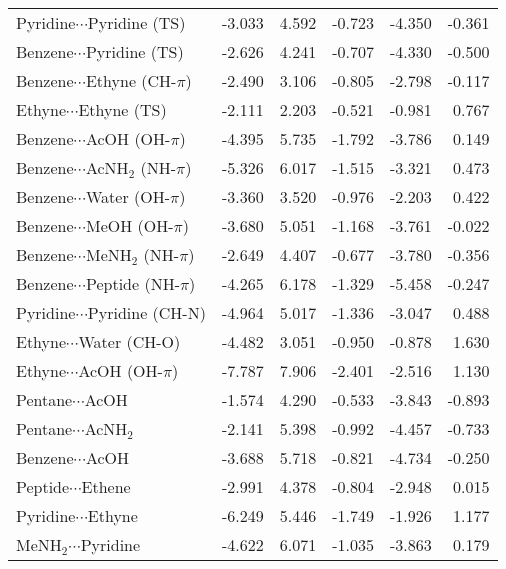 \begin{longtable}{lrrrrr}
Pyridine$\cdots$Pyridine (TS) & -3.033 & 4.592 & -0.723 & -4.350 & -0.361 \\
Benzene$\cdots$Pyridine (TS) & -2.626 & 4.241 & -0.707 & -4.330 & -0.500 \\
Benzene$\cdots$Ethyne (CH-$\pi$) & -2.490 & 3.106 & -0.805 & -2.798 & -0.117 \\
Ethyne$\cdots$Ethyne (TS) & -2.111 & 2.203 & -0.521 & -0.981 & 0.767 \\
Benzene$\cdots$AcOH (OH-$\pi$) & -4.395 & 5.735 & -1.792 & -3.786 & 0.149 \\
Benzene$\cdots$AcNH$_2$ (NH-$\pi$) & -5.326 & 6.017 & -1.515 & -3.321 & 0.473 \\
Benzene$\cdots$Water (OH-$\pi$) & -3.360 & 3.520 & -0.976 & -2.203 & 0.422 \\
Benzene$\cdots$MeOH (OH-$\pi$) & -3.680 & 5.051 & -1.168 & -3.761 & -0.022 \\
Benzene$\cdots$MeNH$_2$ (NH-$\pi$) & -2.649 & 4.407 & -0.677 & -3.780 & -0.356 \\
Benzene$\cdots$Peptide (NH-$\pi$) & -4.265 & 6.178 & -1.329 & -5.458 & -0.247 \\
Pyridine$\cdots$Pyridine (CH-N) & -4.964 & 5.017 & -1.336 & -3.047 & 0.488 \\
Ethyne$\cdots$Water (CH-O) & -4.482 & 3.051 & -0.950 & -0.878 & 1.630 \\
Ethyne$\cdots$AcOH (OH-$\pi$) & -7.787 & 7.906 & -2.401 & -2.516 & 1.130 \\
Pentane$\cdots$AcOH & -1.574 & 4.290 & -0.533 & -3.843 & -0.893 \\
Pentane$\cdots$AcNH$_2$ & -2.141 & 5.398 & -0.992 & -4.457 & -0.733 \\
Benzene$\cdots$AcOH & -3.688 & 5.718 & -0.821 & -4.734 & -0.250 \\
Peptide$\cdots$Ethene & -2.991 & 4.378 & -0.804 & -2.948 & 0.015 \\
Pyridine$\cdots$Ethyne & -6.249 & 5.446 & -1.749 & -1.926 & 1.177 \\
MeNH$_2$$\cdots$Pyridine & -4.622 & 6.071 & -1.035 & -3.863 & 0.179 \\
\end{longtable}